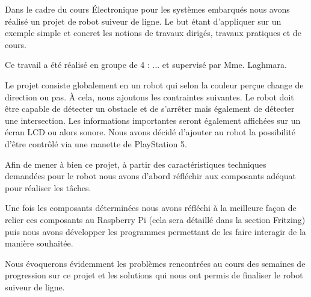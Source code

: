 Dans le cadre du cours Électronique pour les systèmes embarqués nous avons réalisé un projet de robot suiveur de ligne. Le but étant d'appliquer sur un exemple simple et concret les notions de travaux dirigés, travaux pratiques et de cours.

Ce travail a été réalisé en groupe de 4 : ... et supervisé par Mme. Laghmara.

Le projet consiste globalement en un robot qui selon la couleur perçue change de direction ou pas. À cela, nous ajoutons les contraintes suivantes. Le robot doit être capable de détecter un obstacle et de s'arrêter mais également de détecter une intersection. Les informations importantes seront également affichées sur un écran LCD ou alors sonore. Nous avons décidé d'ajouter au robot la possibilité d'être contrôlé via une manette de PlayStation 5.

Afin de mener à bien ce projet, à partir des caractéristiques techniques demandées pour le robot nous avons d'abord réfléchir aux composants adéquat pour réaliser les tâches.

Une fois les composants déterminées nous avons réfléchi à la meilleure façon de relier ces composants au Raspberry Pi (cela sera détaillé dans la section Fritzing) puis nous avons développer les programmes permettant de les faire interagir de la manière souhaitée.

Nous évoquerons évidemment les problèmes rencontrées au cours des semaines de progression sur ce projet et les solutions qui nous ont permis de finaliser le robot suiveur de ligne.